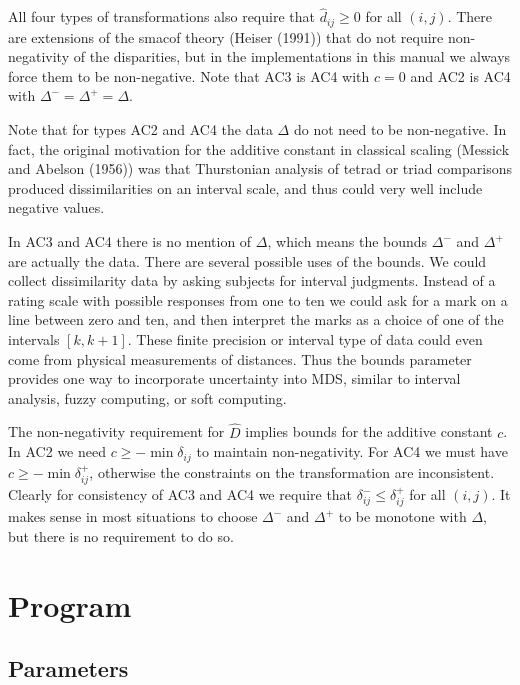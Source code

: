 \documentclass[
  12pt,
]{article}
\begin{document}
All four types of transformations also require that \(\hat d_{ij}\geq 0\) for all \((i,j)\). There are extensions of the smacof theory (Heiser (1991)) that do not require non-negativity of the disparities, but in the implementations in this manual we always force them to be non-negative. Note that AC3 is AC4 with \(c=0\) and AC2 is AC4 with \(\Delta^-=\Delta^+=\Delta\).

Note that for types AC2 and AC4 the data \(\Delta\) do not need to be non-negative. In fact,
the original motivation for the additive constant in classical scaling (Messick and Abelson (1956))
was that Thurstonian analysis of tetrad or triad comparisons produced dissimilarities on an interval scale, and thus could very well include negative values.

In AC3 and AC4 there is no mention of \(\Delta\), which means
the bounds \(\Delta^-\) and \(\Delta^+\) are actually the data. There are several possible uses of the bounds. We could
collect dissimilarity data by asking subjects for interval judgments. Instead
of a rating scale with possible responses from one to ten we could ask
for a mark on a line between zero and ten, and then interpret the
marks as a choice of one of the intervals \([k, k+1]\). These finite precision
or interval type of data could even come from physical measurements of distances.
Thus the bounds parameter provides one way to incorporate uncertainty into MDS, similar to interval analysis, fuzzy computing, or soft computing.

The non-negativity requirement for \(\hat D\) implies bounds for the additive constant
\(c\). In AC2 we need \(c\geq-\min\delta_{ij}\) to maintain non-negativity. For AC4 we must have \(c\geq-\min\delta_{ij}^+\), otherwise the constraints on the transformation are inconsistent.
Clearly for consistency of AC3 and AC4 we require that \(\delta_{ij}^-\leq\delta_{ij}^+\)
for all \((i,j)\). It makes sense in most situations to choose \(\Delta^-\) and \(\Delta^+\)
to be monotone with \(\Delta\), but there is no requirement to do so.

\section{Program}\label{program}

\subsection{Parameters}\label{parameters}
\end{document}
